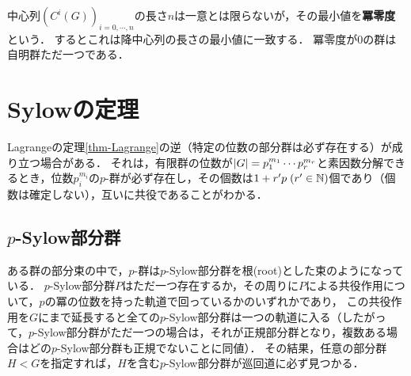 \documentclass[uplatex,dvipdfmx]{jsreport}
\begin{document}
\begin{definition}
    中心列$(C^i(G))_{i=0,\cdots,n}$の長さ$n$は一意とは限らないが，その最小値を\textbf{冪零度}という．
    するとこれは降中心列の長さの最小値に一致する．
    冪零度が$0$の群は自明群ただ一つである．
\end{definition}

\section{Sylowの定理}

\begin{tcolorbox}[colframe=ForestGreen, colback=ForestGreen!10!white,breakable,colbacktitle=ForestGreen!40!white,coltitle=black,fonttitle=\bfseries\sffamily,
title=]
    Lagrangeの定理\ref{thm-Lagrange}の逆（特定の位数の部分群は必ず存在する）が成り立つ場合がある．
    それは，有限群の位数が$\lvert G\rvert=p_1^{m_1}\cdots p_r^{m_r}$と素因数分解できるとき，位数$p_i^{m_i}$の$p$-群が必ず存在し，その個数は$1+r'p\;(r'\in\mathbb{N})$個であり（個数は確定しない），互いに共役であることがわかる．
\end{tcolorbox}

\subsection{$p$-Sylow部分群}

\begin{tcolorbox}[colframe=ForestGreen, colback=ForestGreen!10!white,breakable,colbacktitle=ForestGreen!40!white,coltitle=black,fonttitle=\bfseries\sffamily,
title=]
    ある群の部分束の中で，$p$-群は$p$-Sylow部分群を根(root)とした束のようになっている．
    $p$-Sylow部分群$P$はただ一つ存在するか，その周りに$P$による共役作用について，$p$の冪の位数を持った軌道で回っているかのいずれかであり，
    この共役作用を$G$にまで延長すると全ての$p$-Sylow部分群は一つの軌道に入る（したがって，$p$-Sylow部分群がただ一つの場合は，それが正規部分群となり，複数ある場合はどの$p$-Sylow部分群も正規でないことに同値）．
    その結果，任意の部分群$H<G$を指定すれば，$H$を含む$p$-Sylow部分群が巡回道に必ず見つかる．
\end{tcolorbox}
\end{document}
